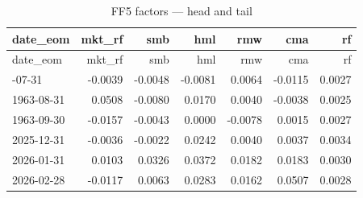 \documentclass[
  letterpaper,
  DIV=11,
  numbers=noendperiod]{scrartcl}
\newenvironment{Shaded}{\begin{snugshade}}{\end{snugshade}}
\newcommand{\AttributeTok}[1]{\textcolor[rgb]{0.40,0.45,0.13}{#1}}
\newcommand{\FunctionTok}[1]{\textcolor[rgb]{0.28,0.35,0.67}{#1}}
\newcommand{\NormalTok}[1]{\textcolor[rgb]{0.00,0.23,0.31}{#1}}
\newcommand{\SpecialCharTok}[1]{\textcolor[rgb]{0.37,0.37,0.37}{#1}}
\newcommand{\StringTok}[1]{\textcolor[rgb]{0.13,0.47,0.30}{#1}}
\begin{document}
\begin{longtable}[]{@{}lrrrrrr@{}}
\caption{FF5 factors --- head and tail}\tabularnewline
\toprule\noalign{}
date\_eom & mkt\_rf & smb & hml & rmw & cma & rf \\
\midrule\noalign{}
\endfirsthead
\toprule\noalign{}
date\_eom & mkt\_rf & smb & hml & rmw & cma & rf \\
\midrule\noalign{}
\endhead
\bottomrule\noalign{}
\endlastfoot
1963-07-31 & -0.0039 & -0.0048 & -0.0081 & 0.0064 & -0.0115 & 0.0027 \\
1963-08-31 & 0.0508 & -0.0080 & 0.0170 & 0.0040 & -0.0038 & 0.0025 \\
1963-09-30 & -0.0157 & -0.0043 & 0.0000 & -0.0078 & 0.0015 & 0.0027 \\
2025-12-31 & -0.0036 & -0.0022 & 0.0242 & 0.0040 & 0.0037 & 0.0034 \\
2026-01-31 & 0.0103 & 0.0326 & 0.0372 & 0.0182 & 0.0183 & 0.0030 \\
2026-02-28 & -0.0117 & 0.0063 & 0.0283 & 0.0162 & 0.0507 & 0.0028 \\
\end{longtable}

\begin{Shaded}
\end{Shaded}
\end{document}
